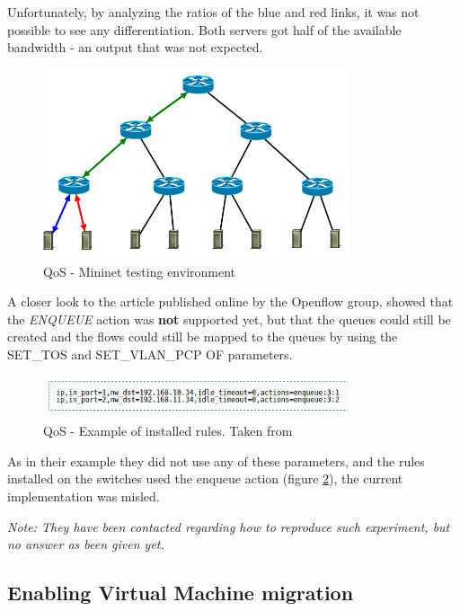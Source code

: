 \documentclass[12pt,english,oneside]{book}
\begin{document}
Unfortunately, by analyzing the ratios of the blue and red links, it was not possible to see any differentiation. Both servers got half of the available bandwidth - an output that was not expected.

\begin{figure}[h!tbp]
        \centering
        \includegraphics[width=0.8\textwidth]{figures/ofqos.png}
        \caption{QoS - Mininet testing environment}
        \label{fig:ofqos}
\end{figure}

A closer look to the article published online by the Openflow group\cite{qosof}, showed that the \textit{ENQUEUE} action was \textbf{not} supported yet, but that the queues could still be created and the flows could still be mapped to the queues by using the SET\_TOS and SET\_VLAN\_PCP OF parameters.
\begin{figure}[h!tbp]
        \centering
        \includegraphics[width=0.8\textwidth]{figures/ofqosexample.png}
        \caption{QoS - Example of installed rules. Taken from \cite{qosof}}
        \label{fig:ofqosexample}
\end{figure}
As in their example they did not use any of these parameters, and the rules installed on the switches used the enqueue action (figure \ref{fig:ofqosexample}), the current implementation was misled.

\textit{Note: They have been contacted regarding how to reproduce such experiment, but no answer as been given yet.}

\newpage

\subsection{Enabling Virtual Machine migration}
\end{document}
